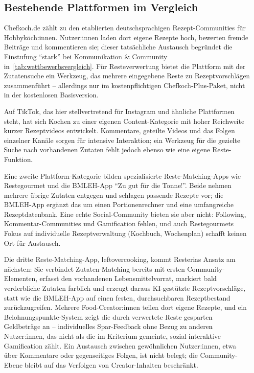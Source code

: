 \subsection{Bestehende Plattformen im Vergleich}\label{sec:wettbewerbsanalyse}

Chefkoch.de zählt zu den etablierten deutschsprachigen Rezept-Communities für Hobbyköch:innen. Nutzer:innen laden dort eigene Rezepte hoch, bewerten fremde Beiträge und kommentieren sie; dieser tatsächliche Austausch begründet die Einstufung \enquote{stark} bei Kommunikation \& Community in~\autoref{tab:wettbewerbsvergleich}. Für Resteverwertung bietet die Plattform mit der Zutatensuche ein Werkzeug, das mehrere eingegebene Reste zu Rezeptvorschlägen zusammenführt – allerdings nur im kostenpflichtigen Chefkoch-Plus-Paket, nicht in der kostenlosen Basisversion.

Auf TikTok, das hier stellvertretend für Instagram und ähnliche Plattformen steht, hat sich Kochen zu einer eigenen Content-Kategorie mit hoher Reichweite kurzer Rezeptvideos entwickelt. Kommentare, geteilte Videos und das Folgen einzelner Kanäle sorgen für intensive Interaktion; ein Werkzeug für die gezielte Suche nach vorhandenen Zutaten fehlt jedoch ebenso wie eine eigene Reste-Funktion.

Eine zweite Plattform-Kategorie bilden spezialisierte Reste-Matching-Apps wie Restegourmet und die \ac{BMLEH}-App \enquote{Zu gut für die Tonne!}. Beide nehmen mehrere übrige Zutaten entgegen und schlagen passende Rezepte vor; die \ac{BMLEH}-App ergänzt das um einen Portionenrechner und eine umfangreiche Rezeptdatenbank. Eine echte Social-Community bieten sie aber nicht: Following, Kommentar-Communities und Gamification fehlen, und auch Restegourmets Fokus auf individuelle Rezeptverwaltung (Kochbuch, Wochenplan) schafft keinen Ort für Austausch.

Die dritte Reste-Matching-App, leftovercooking, kommt Resterias Ansatz am nächsten: Sie verbindet Zutaten-Matching bereits mit ersten Community-Elementen, erfasst den vorhandenen Lebensmittelvorrat, markiert bald verderbliche Zutaten farblich und erzeugt daraus KI-gestützte Rezeptvorschläge, statt wie die \ac{BMLEH}-App auf einen festen, durchsuchbaren Rezeptbestand zurückzugreifen. Mehrere Food-Creator:innen teilen dort eigene Rezepte, und ein Belohnungspunkte-System zeigt die durch verwertete Reste gesparten Geldbeträge an – individuelles Spar-Feedback ohne Bezug zu anderen Nutzer:innen, das nicht als die im Kriterium gemeinte, sozial-interaktive Gamification zählt. Ein Austausch zwischen gewöhnlichen Nutzer:innen, etwa über Kommentare oder gegenseitiges Folgen, ist nicht belegt; die Community-Ebene bleibt auf das Verfolgen von Creator-Inhalten beschränkt.

